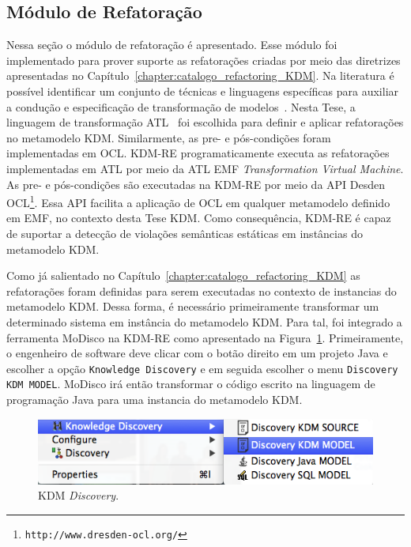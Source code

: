 \subsection{Módulo de Refatoração}

Nessa seção o módulo de refatoração é apresentado. Esse módulo foi implementado para prover suporte as refatorações criadas por meio das diretrizes apresentadas no Capítulo~\ref{chapter:catalogo_refactoring_KDM}. Na literatura é possível identificar um conjunto de técnicas e linguagens específicas para auxiliar a condução e especificação de transformação de modelos~\cite{Biehl_2010, Mens_2006, Allilaire_06}. Nesta Tese, a linguagem de transformação ATL~\cite{ATL_eclipse,Jouault_2008} foi escolhida para definir e aplicar refatorações no metamodelo KDM. Similarmente, as pre- e pós-condições foram implementadas em OCL. KDM-RE programaticamente executa as refatorações implementadas em ATL por meio da ATL EMF \textit{Transformation Virtual Machine}. As pre- e pós-condições são executadas na KDM-RE por meio da API Desden OCL\footnote{\texttt{http://www.dresden-ocl.org/}}. Essa API facilita a aplicação de OCL em qualquer metamodelo definido em EMF, no contexto desta Tese KDM. Como consequência, KDM-RE é capaz de suportar a detecção de violações semânticas estáticas em instâncias do metamodelo KDM.


Como já salientado no Capítulo~\ref{chapter:catalogo_refactoring_KDM} as refatorações foram definidas para serem executadas no contexto de instancias do metamodelo KDM. Dessa forma, é necessário primeiramente transformar um determinado sistema em instância do metamodelo KDM. Para tal, foi integrado a ferramenta MoDisco na KDM-RE como apresentado na Figura~\ref{fig:kdm_modisco_discovery}. Primeiramente, o engenheiro de software deve clicar com o botão direito em um projeto Java e escolher a opção \texttt{Knowledge Discovery} e em seguida escolher o menu \texttt{Discovery KDM MODEL}. MoDisco irá então transformar o código escrito na linguagem de programação Java para uma instancia do metamodelo KDM. 

\begin{figure}[h]
	\centering
	\caption{KDM \textit{Discovery}.}
	\label{fig:kdm_modisco_discovery}
	\includegraphics[scale=0.65]{images/kdm_discovery_kdm_re}
	\fautor
\end{figure}

